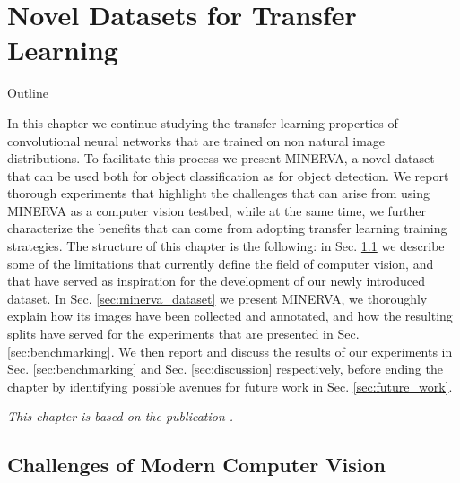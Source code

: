 \chapter{Novel Datasets for Transfer Learning}

\begin{remark}{Outline}

	In this chapter we continue studying the transfer learning properties of convolutional neural networks that are trained on non natural image distributions. To facilitate this process we present MINERVA, a novel dataset that can be used both for object classification as for object detection. We report thorough experiments that highlight the challenges that can arise from using MINERVA as a computer vision testbed, while at the same time, we further characterize the benefits that can come from adopting transfer learning training strategies. The structure of this chapter is the following: in Sec. \ref{sec:cv_challenges} we describe some of the limitations that currently define the field of computer vision, and that have served as inspiration for the development of our newly introduced dataset. In Sec. \ref{sec:minerva_dataset} we present MINERVA, we thoroughly explain how its images have been collected and annotated, and how the resulting splits have served for the experiments that are presented in Sec. \ref{sec:benchmarking}. We then report and discuss the results of our experiments in Sec. \ref{sec:benchmarking} and Sec. \ref{sec:discussion} respectively, before ending the chapter by identifying possible avenues for future work in Sec. \ref{sec:future_work}. 

\vspace{5mm}
\textit{This chapter is based on the publication \citet{sabatelli2021advances}.}
\label{ch:minerva_paper}


\end{remark}


\section{Challenges of Modern Computer Vision}
\label{sec:cv_challenges}

